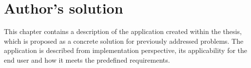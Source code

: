 \chapter{Author's solution}

This chapter contains a description of the application created within the thesis, which is proposed as a concrete solution for previously addressed problems. The application is described from implementation perspective, its applicability for the end user and how it meets the predefined requirements.





